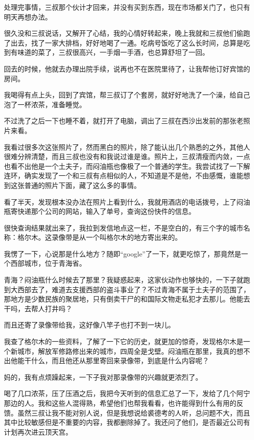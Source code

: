 处理完事情，三叔那个伙计才回来，并没有买到东西，现在市场都关门了，也只有明天再想办法。

很久没和三叔说话，又解开了心结，我的心情好转起来，晚上我就和三叔他们偷跑了出去，找了一家大排档，好好地喝了一通。吃病号饭吃了这么长时间，总算是吃到有味道的菜了，三叔很高兴，一手烟一手酒，也总算舒坦了一回。

回去的时候，他就去办理出院手续，说再也不在医院里待了，让我帮他订好宾馆的房间。

我喝得有点上头，回到了宾馆，帮三叔订了个套房，就好好地洗了一个澡，给自己泡了一杯浓茶，准备睡觉。

不过洗了之后一下也睡不着，就打开了电脑，调出了三叔在西沙出发前的那张老照片来看。

我看过很多次这张照片了，然而黑白的照片，除了能认出几个熟悉的之外，其他人很难分辨清楚，而且三叔也没有和我说过谁是谁。照片上，三叔清瘦而内敛，一点也看不出他是一个土夫子，而闷油瓶也像极了一个普通的学生。我尝试找了一下解连环，确实发现了一个和三叔有点相似的人，不知道是不是他，不由感慨，谁能想到这张普通的照片下面，藏了这么多的事情。

看了半天，发现根本没办法在照片上看到什么，我就用酒店的电话拨号，上了闷油瓶寄快递那个公司的网站，输入了单号，查询这份快件的信息。

很快查询结果就出来了，我拉到发信地点这一栏，不是空白的，有三个字的城市名称：格尔木。这录像带是从一个叫格尔木的地方寄出来的。

我愣了一下，心说那是什么地方？随即“google”了一下，就更吃惊了，那竟然是一个西部城市，位于青海省。

青海？闷油瓶什么时候去了那里？我疑惑起来，这家伙动作也够快的，一下子就跑到大西部去了，难道去支援西部的盗斗事业了？不过青海不属于土夫子的范围了，那地方是少数民族的聚居地，只有倒卖干尸的和国际文物走私犯才去那儿。他能去干吗，去帮人打井吗？

而且还寄了录像带给我，这好像八竿子也打不到一块儿。

我查了格尔木的一些资料，了解了一下它的历史，就更加的惊奇，发现格尔木是一个新城市，解放军修路修出来的城市，四周全是戈壁。闷油瓶在那里，我真的想不出他能干什么，而且他还从那里寄回来录像带，到底是什么内容呢？

妈的，我有点烦躁起来，一下子我对那录像带的兴趣就更浓烈了。

喝了几口浓茶，压了压酒之后，我把今天听到的信息汇总了一下，发给了几个阿宁那边的人。我和这些人混得熟，希望他们也帮我看看，也许能得到什么有用的反馈。虽然三叔让我不能对别人说，但是我想说给裘德考的人听，总问题不大，而且其中比较敏感但是不重要的内容，我都删除掉了。我还问了他们，是否最近公司有计划再次进云顶天宫。

